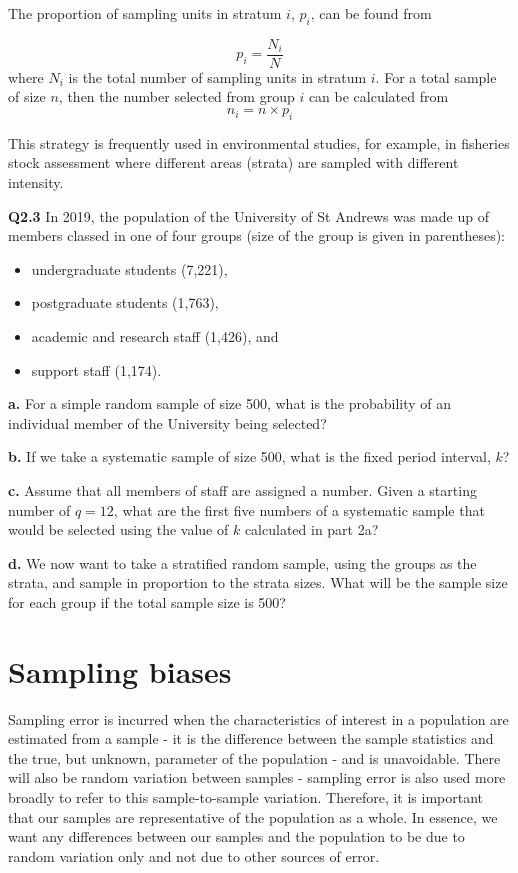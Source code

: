 \documentclass[
  oneside]{krantz}
\begin{document}
The proportion of sampling units in stratum \(i\), \(p_i\), can be found from

\[p_i = \frac{N_i}{N} \]
where \(N_i\) is the total number of sampling units in stratum \(i\). For a total sample of size \(n\), then the number selected from group \(i\) can be calculated from
\[n_i = n \times p_i\]

This strategy is frequently used in environmental studies, for example, in fisheries stock assessment where different areas (strata) are sampled with different intensity.

\textbf{Q2.3} In 2019, the population of the University of St Andrews was made up of members classed in one of four groups (size of the group is given in parentheses):

\begin{itemize}
\item
  undergraduate students (7,221),
\item
  postgraduate students (1,763),
\item
  academic and research staff (1,426), and
\item
  support staff (1,174).
\end{itemize}

\textbf{a.} For a simple random sample of size 500, what is the probability of an individual member of the University being selected?

\textbf{b.} If we take a systematic sample of size 500, what is the fixed period interval, \(k\)?

\textbf{c.} Assume that all members of staff are assigned a number. Given a starting number of \(q = 12\), what are the first five numbers of a systematic sample that would be selected using the value of \(k\) calculated in part 2a?

\textbf{d.} We now want to take a stratified random sample, using the groups as the strata, and sample in proportion to the strata sizes. What will be the sample size for each group if the total sample size is 500?

\hypertarget{sampling-biases}{%
\section{Sampling biases}\label{sampling-biases}}

Sampling error is incurred when the characteristics of interest in a population are estimated from a sample - it is the difference between the sample statistics and the true, but unknown, parameter of the population - and is unavoidable. There will also be random variation between samples - sampling error is also used more broadly to refer to this sample-to-sample variation. Therefore, it is important that our samples are representative of the population as a whole. In essence, we want any differences between our samples and the population to be due to random variation only and not due to other sources of error.
\end{document}
